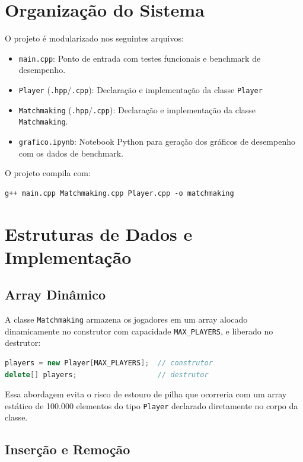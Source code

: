 \documentclass[11pt,a4paper]{article}
\begin{document}
\section{Organização do Sistema}
 
O projeto é modularizado nos seguintes arquivos:
 
\begin{itemize}
    \item \texttt{main.cpp}: Ponto de entrada com testes funcionais e benchmark de desempenho.
    \item \texttt{Player} (\texttt{.hpp}/\texttt{.cpp}): Declaração e implementação da classe \texttt{Player}
    \item \texttt{Matchmaking} (\texttt{.hpp}/\texttt{.cpp}): Declaração e implementação da classe \texttt{Matchmaking}.
    \item \texttt{grafico.ipynb}: Notebook Python para geração dos gráficos de desempenho com os dados de benchmark.
\end{itemize}


O projeto compila com:
 
\begin{lstlisting}
g++ main.cpp Matchmaking.cpp Player.cpp -o matchmaking
\end{lstlisting}
 
\section{Estruturas de Dados e Implementação}

\subsection{Array Dinâmico}
 
A classe \texttt{Matchmaking} armazena os jogadores em um array alocado dinamicamente no construtor com capacidade \texttt{MAX\_PLAYERS}, e liberado no destrutor:
 
\begin{lstlisting}[language=C++]
players = new Player[MAX_PLAYERS];  // construtor
delete[] players;                   // destrutor
\end{lstlisting}
 
Essa abordagem evita o risco de estouro de pilha que ocorreria com um array estático de 100.000 elementos do tipo \texttt{Player} declarado diretamente no corpo da classe.

 \subsection{Inserção e Remoção}
 
\end{document}
